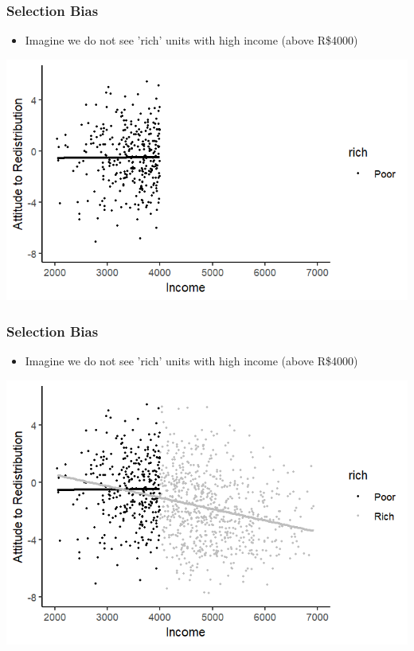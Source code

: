 \documentclass[xcolor=x11names,compress]{beamer}\usepackage[]{graphicx}\usepackage[]{color}
\makeatletter
\def\maxwidth{ %
  \ifdim\Gin@nat@width>\linewidth
    \linewidth
  \else
    \Gin@nat@width
  \fi
}
\newenvironment{knitrout}{}{} %
\renewcommand{\(}{\begin{columns}}
\renewcommand{\)}{\end{columns}}
\newcommand{\<}[1]{\begin{column}{#1}}
\renewcommand{\>}{\end{column}}
\makeatother
\begin{document}
\begin{frame}
\frametitle{Selection Bias}
\begin{itemize}
\item Imagine we do not see 'rich' units with high income (above R\$4000)
\end{itemize}
\begin{knitrout}
\color{fgcolor}
\includegraphics[width=\maxwidth]{figure/selection1-1} 

\end{knitrout}
\end{frame}

\begin{frame}
\frametitle{Selection Bias}
\begin{itemize}
\item Imagine we do not see 'rich' units with high income (above R\$4000)
\end{itemize}
\begin{knitrout}
\color{fgcolor}
\includegraphics[width=\maxwidth]{figure/selection2-1} 

\end{knitrout}
\end{frame}
\end{document}
